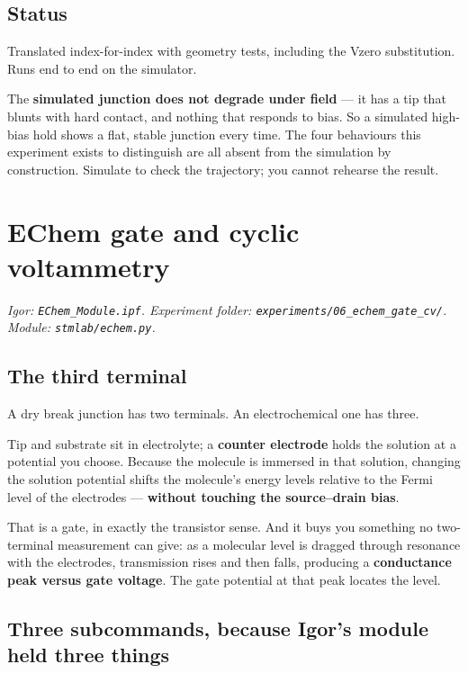 \section{Status}

Translated index-for-index with geometry tests, including the Vzero substitution. Runs end to end on the simulator.

The \textbf{simulated junction does not degrade under field} --- it has a tip that blunts with hard contact, and nothing that responds to bias. So a simulated high-bias hold shows a flat, stable junction every time. The four behaviours this experiment exists to distinguish are all absent from the simulation by construction. Simulate to check the trajectory; you cannot rehearse the result.

\setcounter{chapter}{14}
\chapter{EChem gate and cyclic voltammetry}

\emph{Igor: \texttt{EChem\_\discretionary{}{}{}Module.\discretionary{}{}{}ipf}. Experiment folder: \texttt{experiments/\discretionary{}{}{}06\_\discretionary{}{}{}echem\_\discretionary{}{}{}gate\_\discretionary{}{}{}cv/\discretionary{}{}{}}. Module: \texttt{stmlab/\discretionary{}{}{}echem.\discretionary{}{}{}py}.}

\section{The third terminal}

A dry break junction has two terminals. An electrochemical one has three.

Tip and substrate sit in electrolyte; a \textbf{counter electrode} holds the solution at a potential you choose. Because the molecule is immersed in that solution, changing the solution potential shifts the molecule's energy levels relative to the Fermi level of the electrodes --- \textbf{without touching the source--drain bias}.

That is a gate, in exactly the transistor sense. And it buys you something no two-terminal measurement can give: as a molecular level is dragged through resonance with the electrodes, transmission rises and then falls, producing a \textbf{conductance peak versus gate voltage}. The gate potential at that peak locates the level.

\section{Three subcommands, because Igor's module held three things}

